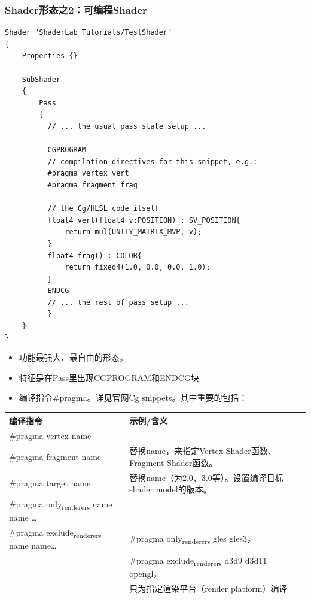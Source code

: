 \documentclass[9pt, b5paper]{article}
\begin{document}
\subsubsection{Shader形态之2：可编程Shader}
\label{sec:org817b793}
\begin{verbatim}
Shader "ShaderLab Tutorials/TestShader"
{
    Properties {}

    SubShader
    {
        Pass
        {
          // ... the usual pass state setup ...

          CGPROGRAM
          // compilation directives for this snippet, e.g.:
          #pragma vertex vert
          #pragma fragment frag

          // the Cg/HLSL code itself
          float4 vert(float4 v:POSITION) : SV_POSITION{
              return mul(UNITY_MATRIX_MVP, v);
          }
          float4 frag() : COLOR{
              return fixed4(1.0, 0.0, 0.0, 1.0);
          }
          ENDCG
          // ... the rest of pass setup ...
          }
    }
}
\end{verbatim}
\begin{itemize}
\item 功能最强大、最自由的形态。
\item 特征是在Pass里出现CGPROGRAM和ENDCG块
\item 编译指令\#pragma。详见官网Cg snippets。其中重要的包括：
\end{itemize}
\begin{center}
\begin{tabular}{ll}
\hline
编译指令 & 示例/含义\\
\hline
\#pragma vertex name & \\
\#pragma fragment name & 替换name，来指定Vertex Shader函数、Fragment Shader函数。\\
\hline
\#pragma target name & 替换name（为2.0、3.0等）。设置编译目标shader model的版本。\\
\hline
\#pragma only\textsubscript{renderers} name name \ldots{} & \\
\#pragma exclude\textsubscript{renderers} name name\ldots{} & \#pragma only\textsubscript{renderers} gles gles3，\\
 & \#pragma exclude\textsubscript{renderers} d3d9 d3d11 opengl，\\
 & 只为指定渲染平台（render platform）编译\\
\hline
\end{tabular}
\end{center}
\end{document}
